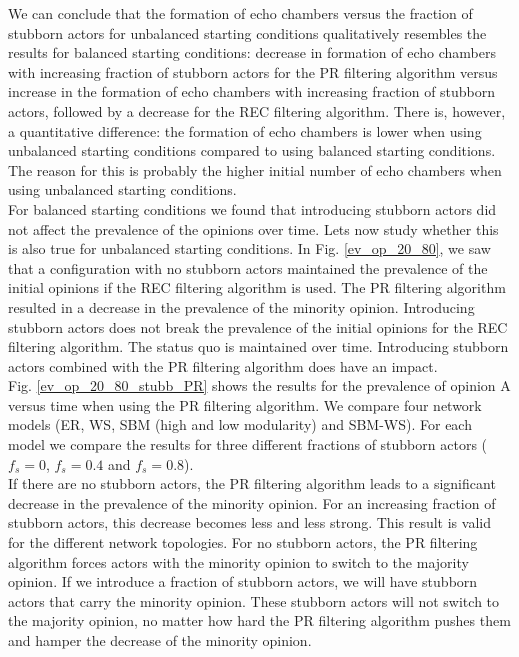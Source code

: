 \documentclass[11 pt , letterpaper , twoside , openright]{book}
\begin{document}
\newline
We can conclude that the formation of echo chambers versus the fraction of stubborn actors for unbalanced starting conditions qualitatively resembles the results for balanced starting conditions: decrease in formation of echo chambers with increasing fraction of stubborn actors for the PR filtering algorithm versus increase in the formation of echo chambers with increasing fraction of stubborn actors, followed by a decrease for the REC filtering algorithm. There is, however, a quantitative difference: the formation of echo chambers is lower when using unbalanced starting conditions compared to using balanced starting conditions. The reason for this is probably the higher initial number of echo chambers when using unbalanced starting conditions.\\
\newline
For balanced starting conditions we found that introducing stubborn actors did not affect the prevalence of the opinions over time. Lets now study whether this is also true for unbalanced starting conditions. In Fig. \ref{ev_op_20_80}, we saw that a configuration with no stubborn actors maintained the prevalence of the initial opinions if the REC filtering algorithm is used. The PR filtering algorithm resulted in a decrease in the prevalence of the minority opinion. Introducing stubborn actors does not break the prevalence of the initial opinions for the REC filtering algorithm. The status quo is maintained over time. Introducing stubborn actors combined with the PR filtering algorithm does have an impact.\\
\newline
Fig. \ref{ev_op_20_80_stubb_PR} shows the results for the prevalence of opinion A versus time when using the PR filtering algorithm. We compare four network models (ER, WS, SBM (high and low modularity) and SBM-WS). For each model we compare the results for three different fractions of stubborn actors ($f_s=0$, $f_s=0.4$ and $f_s=0.8$).\\
\newline
If there are no stubborn actors, the PR filtering algorithm leads to a significant decrease in the prevalence of the minority opinion. For an increasing fraction of stubborn actors, this decrease becomes less and less strong. This result is valid for the different network topologies. For no stubborn actors, the PR filtering algorithm forces actors with the minority opinion to switch to the majority opinion. If we introduce a fraction of stubborn actors, we will have stubborn actors that carry the minority opinion. These stubborn actors will not switch to the majority opinion, no matter how hard the PR filtering algorithm pushes them and hamper the decrease of the minority opinion. 
\end{document}
